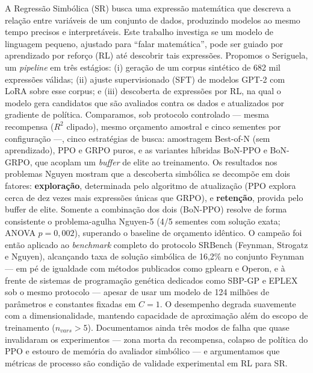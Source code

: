 \documentclass[Ingles, hidelinks]{ic-tese-v3} %
\begin{document}
\begin{resumo}
A Regressão Simbólica (SR) busca uma expressão matemática que descreva a relação entre variáveis de um conjunto de dados, produzindo modelos ao mesmo tempo precisos e interpretáveis. Este trabalho investiga se um modelo de linguagem pequeno, ajustado para ``falar matemática'', pode ser guiado por aprendizado por reforço (RL) até descobrir tais expressões. Propomos o Seriguela, um \textit{pipeline} em três estágios: (i) geração de um corpus sintético de 682 mil expressões válidas; (ii) ajuste supervisionado (SFT) de modelos GPT-2 com LoRA sobre esse corpus; e (iii) descoberta de expressões por RL, na qual o modelo gera candidatos que são avaliados contra os dados e atualizados por gradiente de política. Comparamos, sob protocolo controlado — mesma recompensa ($R^2$ clipado), mesmo orçamento amostral e cinco sementes por configuração —, cinco estratégias de busca: amostragem Best-of-N (sem aprendizado), PPO e GRPO puros, e as variantes híbridas BoN-PPO e BoN-GRPO, que acoplam um \textit{buffer} de elite ao treinamento. Os resultados nos problemas Nguyen mostram que a descoberta simbólica se decompõe em dois fatores: \textbf{exploração}, determinada pelo algoritmo de atualização (PPO explora cerca de dez vezes mais expressões únicas que GRPO), e \textbf{retenção}, provida pelo buffer de elite. Somente a combinação dos dois (BoN-PPO) resolve de forma consistente o problema-agulha Nguyen-5 (4/5 sementes com solução exata; ANOVA $p=0{,}002$), superando o baseline de orçamento idêntico. O campeão foi então aplicado ao \textit{benchmark} completo do protocolo SRBench (Feynman, Strogatz e Nguyen), alcançando taxa de solução simbólica de 16,2\% no conjunto Feynman — em pé de igualdade com métodos publicados como gplearn e Operon, e à frente de sistemas de programação genética dedicados como SBP-GP e EPLEX sob o mesmo protocolo — apesar de usar um modelo de 124 milhões de parâmetros e constantes fixadas em $C=1$. O desempenho degrada suavemente com a dimensionalidade, mantendo capacidade de aproximação além do escopo de treinamento ($n_{vars}>5$). Documentamos ainda três modos de falha que quase invalidaram os experimentos — zona morta da recompensa, colapso de política do PPO e estouro de memória do avaliador simbólico — e argumentamos que métricas de processo são condição de validade experimental em RL para SR.
\end{resumo}
\end{document}
